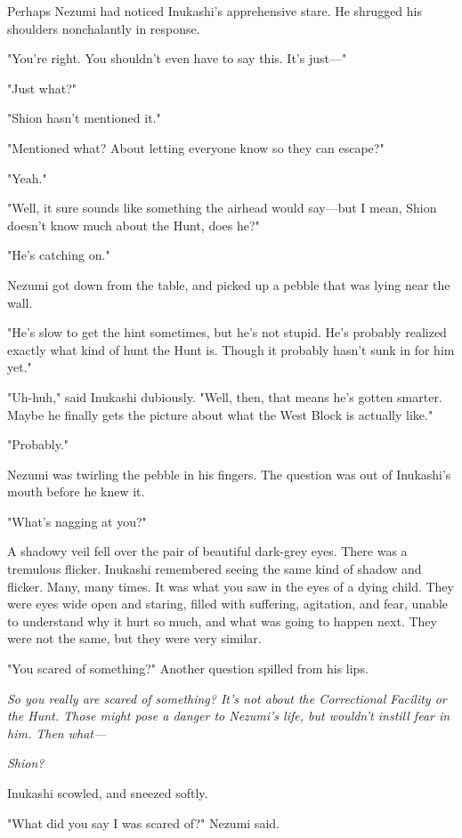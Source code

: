 Perhaps Nezumi had noticed Inukashi's apprehensive stare. He shrugged
his shoulders nonchalantly in response.

"You're right. You shouldn't even have to say this. It's just---"

"Just what?"

"Shion hasn't mentioned it."

"Mentioned what? About letting everyone know so they can escape?"

"Yeah."

"Well, it sure sounds like something the airhead would say---but I mean,
Shion doesn't know much about the Hunt, does he?"

"He's catching on."

Nezumi got down from the table, and picked up a pebble that was lying
near the wall.

"He's slow to get the hint sometimes, but he's not stupid. He's probably
realized exactly what kind of hunt the Hunt is. Though it probably
hasn't sunk in for him yet."

"Uh-huh," said Inukashi dubiously. "Well, then, that means he's gotten
smarter. Maybe he finally gets the picture about what the West Block is
actually like."

"Probably."

Nezumi was twirling the pebble in his fingers. The question was out of
Inukashi's mouth before he knew it.

"What's nagging at you?"

A shadowy veil fell over the pair of beautiful dark-grey eyes. There was
a tremulous flicker. Inukashi remembered seeing the same kind of shadow
and flicker. Many, many times. It was what you saw in the eyes of a
dying child. They were eyes wide open and staring, filled with
suffering, agitation, and fear, unable to understand why it hurt so
much, and what was going to happen next. They were not the same, but
they were very similar.

"You scared of something?" Another question spilled from his lips.

\emph{So you really are scared of something? It's not about the Correctional
Facility or the Hunt. Those might pose a danger to Nezumi's life, but
wouldn't instill fear in him. Then what---}

\emph{Shion?}

Inukashi scowled, and sneezed softly.

"What did you say I was scared of?" Nezumi said.

